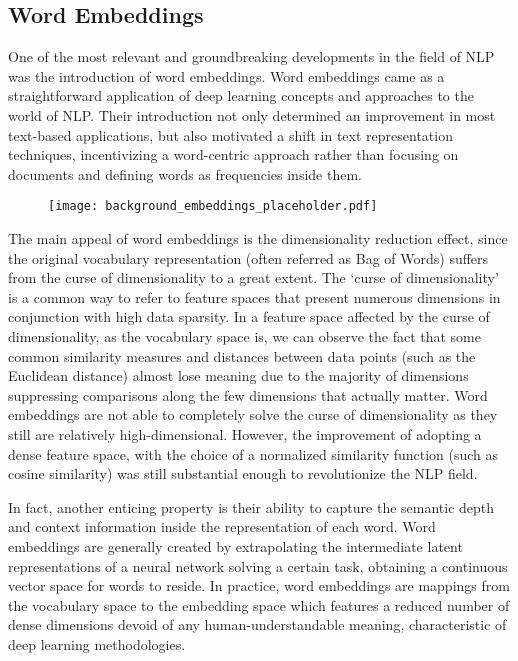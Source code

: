 \subsection{Word Embeddings}

One of the most relevant and groundbreaking developments in the field of NLP was the introduction of word embeddings.
Word embeddings came as a straightforward application of deep learning concepts and approaches to the world of NLP.
Their introduction not only determined an improvement in most text-based applications, but also motivated a shift in text representation techniques, incentivizing a word-centric approach rather than focusing on documents and defining words as frequencies inside them.

\begin{figure}[H]
    \centering
    \texttt{[image: background\_embeddings\_placeholder.pdf]}
    \caption{}
    \label{fig:background_embeddings}
\end{figure}

The main appeal of word embeddings is the dimensionality reduction effect, since the original vocabulary representation (often referred as Bag of Words) suffers from the curse of dimensionality to a great extent.
The `curse of dimensionality' is a common way to refer to feature spaces that present numerous dimensions in conjunction with high data sparsity.
In a feature space affected by the curse of dimensionality, as the vocabulary space is, we can observe the fact that some common similarity measures and distances between data points (such as the Euclidean distance) almost lose meaning due to the majority of dimensions suppressing comparisons along the few dimensions that actually matter.
Word embeddings are not able to completely solve the curse of dimensionality as they still are relatively high-dimensional.
However, the improvement of adopting a dense feature space, with the choice of a normalized similarity function (such as cosine similarity) was still substantial enough to revolutionize the NLP field.

In fact, another enticing property is their ability to capture the semantic depth and context information inside the representation of each word.
Word embeddings are generally created by extrapolating the intermediate latent representations of a neural network solving a certain task, obtaining a continuous vector space for words to reside.
In practice, word embeddings are mappings from the vocabulary space to the embedding space which features a reduced number of dense dimensions devoid of any human-understandable meaning, characteristic of deep learning methodologies.

